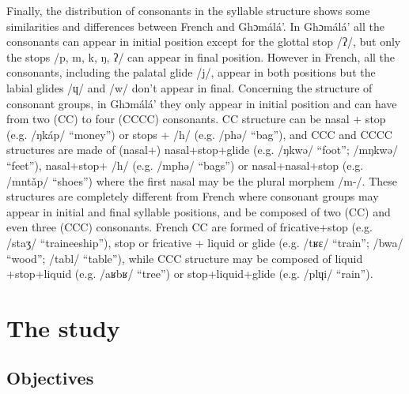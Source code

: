 \documentclass[output=paper,newtxmath,modfonts,nonflat,draftmode]{langsci/langscibook}
\begin{document}
Finally, the distribution of consonants in the syllable structure shows some similarities and differences between French and Ghɔmálá’. In Ghɔmálá’ all the consonants can appear in initial position except for the glottal stop /ʔ/, but only the stops /p, m, k, ŋ, ʔ/ can appear in final position. However in French, all the consonants, including the palatal glide /j/, appear in both positions but the labial glides /ɥ/ and /w/ don’t appear in final. Concerning the structure of consonant groups, in Ghɔmálá’ they only appear in initial position and can have from two (CC) to four (CCCC) consonants. CC structure can be nasal + stop (e.g. /ŋkáp/ “money”) or stops + /h/ (e.g. /phə/ “bag”), and CCC and CCCC structures are made of (nasal+) nasal+stop+glide (e.g. /ŋkwə/ “foot”; /mŋkwə/ “feet”), nasal+stop+ /h/ (e.g. /mphə/ “bags”) or nasal+nasal+stop (e.g. /mntǎp/ “shoes”) where the first nasal may be the plural morphem /m-/. These structures are completely different from French where consonant groups may appear in initial and final syllable positions, and be composed of two (CC) and even three (CCC) consonants. French CC are formed of fricative+stop (e.g. /staʒ/ “traineeship”), stop or fricative + liquid or glide (e.g. /tʁɛ/ “train”; /bwa/ “wood”; /tabl/ “table”), while CCC structure may be composed of liquid +stop+liquid (e.g. /aʁbʁ/ “tree”) or stop+liquid+glide (e.g. /plɥi/ “rain”).

\section{The study} %
\subsection{Objectives} %
\end{document}
